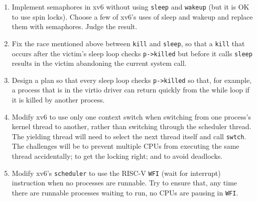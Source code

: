 \begin{enumerate}

\item Implement semaphores in xv6 without using
\lstinline{sleep} and \lstinline{wakeup} (but it
is OK to use spin locks).
Choose a few of xv6's uses of sleep and wakeup and
replace them with semaphores.
Judge the result.

\item Fix the race mentioned above between
\lstinline{kill}
and 
\lstinline{sleep},
so that a
\lstinline{kill}
that occurs after the victim's sleep loop checks
\lstinline{p->killed}
but before it calls
\lstinline{sleep}
results in the victim abandoning the current system call.

\item Design a plan so that every sleep loop checks 
\lstinline{p->killed}
so that, for example, a process that is in the virtio driver can return quickly from the while loop
if it is killed by another process.

\item Modify xv6 to use only one context switch when switching from
  one process's kernel thread to another, rather than switching
  through the scheduler thread. The yielding thread will need to select
  the next thread itself and call \texttt{swtch}. The challenges will
  be to prevent multiple CPUs from executing the same thread accidentally;
  to get the locking right; and to avoid deadlocks.

\item Modify xv6's
\lstinline{scheduler}
to use the
RISC-V
\lstinline{WFI}
(wait for interrupt)
instruction
when no processes are runnable.
Try to ensure that, any time there are runnable processes waiting
to run, no CPUs are pausing in \texttt{WFI}.

\end{enumerate}
